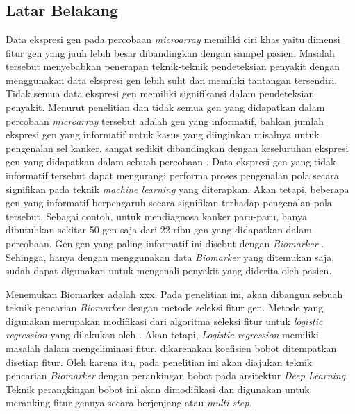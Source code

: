 \chapter{\babSatu}

\section{Latar Belakang}
Data ekspresi gen pada percobaan \textit{microarray} memiliki ciri khas yaitu dimensi fitur gen yang jauh lebih besar dibandingkan dengan sampel pasien. Masalah tersebut menyebabkan penerapan teknik-teknik pendeteksian penyakit dengan menggunakan data ekspresi gen  lebih sulit dan memiliki tantangan tersendiri. Tidak semua data ekspresi gen memiliki signifikansi dalam pendeteksian penyakit. Menurut penelitian \cite{yoon2006building} dan \cite{bandyopadhyay2014survey} tidak semua gen yang didapatkan dalam percobaan \textit{microarray} tersebut adalah gen yang informatif, bahkan jumlah ekspresi gen yang informatif untuk kasus yang diinginkan misalnya untuk pengenalan sel kanker, sangat sedikit dibandingkan dengan keseluruhan ekspresi gen yang didapatkan dalam sebuah percobaan \citep{bandyopadhyay2014survey}. Data ekspresi gen yang tidak informatif tersebut dapat mengurangi performa  proses pengenalan pola secara signifikan pada teknik \textit{machine learning} yang diterapkan. Akan tetapi, beberapa gen yang informatif berpengaruh secara signifikan terhadap pengenalan pola tersebut. Sebagai contoh, untuk mendiagnosa kanker paru-paru, hanya dibutuhkan sekitar 50 gen saja dari 22 ribu gen yang didapatkan dalam percobaan. Gen-gen yang paling informatif ini disebut dengan \textit{Biomarker} \citep{belinsky2004gene}. Sehingga, hanya dengan menggunakan data \textit{Biomarker} yang ditemukan saja, sudah dapat digunakan untuk mengenali penyakit yang diderita oleh pasien.\\


Menemukan Biomarker adalah xxx.
Pada penelitian ini, akan dibangun sebuah teknik pencarian \textit{Biomarker} dengan metode seleksi fitur gen. Metode yang digunakan merupakan modifikasi dari algoritma seleksi fitur untuk \textit{logistic regression} yang dilakukan oleh \cite{shevade2003simple}. Akan tetapi, \textit{Logistic regression} memiliki masalah dalam  mengeliminasi fitur, dikarenakan koefisien bobot ditempatkan disetiap fitur. Oleh karena itu, pada penelitian ini akan diajukan teknik pencarian \textit{Biomarker} dengan perankingan bobot pada arsitektur \textit{Deep Learning}. Teknik perangkingan bobot ini akan dimodifikasi dan digunakan untuk  meranking fitur gennya secara berjenjang atau \textit{multi step}. \\

